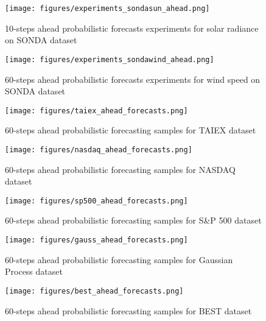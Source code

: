 \begin{figure}
\texttt{[image: figures/experiments\_sondasun\_ahead.png]}
\caption{10-steps ahead probabilistic forecasts experiments for solar radiance on SONDA dataset}
\label{fig:experiments_sondasun_ahead}
\end{figure}

\begin{figure}
\texttt{[image: figures/experiments\_sondawind\_ahead.png]}
\caption{60-steps ahead probabilistic forecasts experiments for wind speed on SONDA dataset}
\label{fig:experiments_sondawind_ahead}
\end{figure}

\begin{figure}
\texttt{[image: figures/taiex\_ahead\_forecasts.png]}
\caption{60-steps ahead probabilistic forecasting samples for TAIEX dataset}
\label{fig:taiex_ahead_forecasts}
\end{figure}

\begin{figure}\ContinuedFloat
\texttt{[image: figures/nasdaq\_ahead\_forecasts.png]}
\caption{60-steps ahead probabilistic forecasting samples for NASDAQ dataset}
\label{fig:nasdaq_ahead_forecasts}
\end{figure}

\begin{figure}\ContinuedFloat
\texttt{[image: figures/sp500\_ahead\_forecasts.png]}
\caption{60-steps ahead probabilistic forecasting samples for S\&P 500 dataset}
\label{fig:sp500_ahead_forecasts}
\end{figure}

\begin{figure}\ContinuedFloat
\texttt{[image: figures/gauss\_ahead\_forecasts.png]}
\caption{60-steps ahead probabilistic forecasting samples for Gaussian Process dataset}
\label{fig:gauss_ahead_forecasts}
\end{figure}

\begin{figure}\ContinuedFloat
\texttt{[image: figures/best\_ahead\_forecasts.png]}
\caption{60-steps ahead probabilistic forecasting samples for BEST dataset}
\label{fig:best_ahead_forecasts}
\end{figure}


